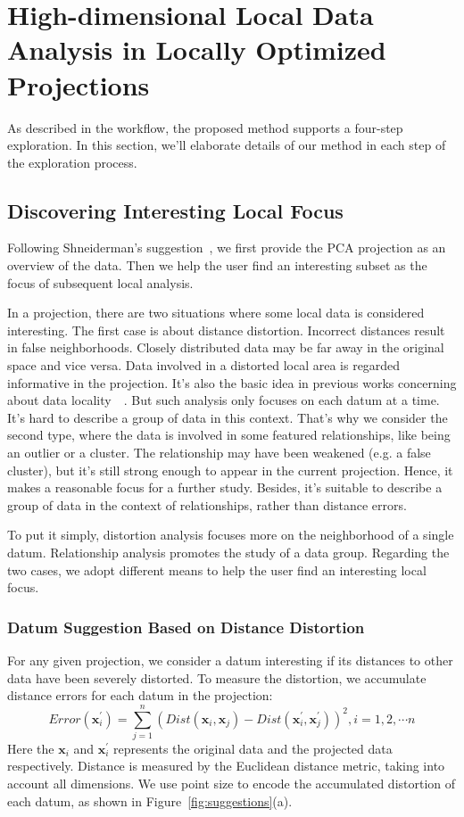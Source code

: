 \section{High-dimensional Local Data Analysis in Locally Optimized Projections}
As described in the workflow, the proposed method supports a four-step exploration. In this section, we'll elaborate details of our method in each step of the exploration process.
\label{section:method}
\subsection{Discovering Interesting Local Focus}
Following Shneiderman's suggestion~\cite{DBLP:conf/vl/Shneiderman96}, we first provide the PCA projection as an overview of the data. Then we help the user find an interesting subset as the focus of subsequent local analysis.

In a projection, there are two situations where some local data is considered interesting. The first case is about distance distortion. Incorrect distances result in false neighborhoods. Closely distributed data may be far away in the original space and vice versa. Data involved in a distorted local area is regarded informative in the projection. It's also the basic idea in previous works concerning about data locality~\cite{DBLP:journals/cg/MartinsCMT14}~\cite{DBLP:journals/tvcg/StahnkeDMT16}. But such analysis only focuses on each datum at a time. It's hard to describe a group of data in this context. That's why we consider the second type, where the data is involved in some featured relationships, like being an outlier or a cluster. The relationship may have been weakened (e.g. a false cluster), but it's still strong enough to appear in the current projection. Hence, it makes a reasonable focus for a further study. Besides, it's suitable to describe a group of data in the context of relationships, rather than distance errors.

To put it simply, distortion analysis focuses more on the neighborhood of a single datum. Relationship analysis promotes the study of a data group. Regarding the two cases, we adopt different means to help the user find an interesting local focus.

\subsubsection{Datum Suggestion Based on Distance Distortion}
For any given projection, we consider a datum interesting if its distances to other data have been severely distorted. To measure the distortion, we accumulate distance errors for each datum in the projection:
\begin{equation}
Error(\mathbf{x}_{i}^{\prime}) = \sum\limits_{j=1}^{n}(Dist(\mathbf{x}_{i}, \mathbf{x}_{j}) - Dist(\mathbf{x}_{i}^{\prime}, \mathbf{x}_{j}^{\prime}))^{2}, i = 1,2,\cdots n
\end{equation}
Here the $\mathbf{x}_{i}$ and $\mathbf{x}_{i}^{\prime}$ represents the original data and the projected data respectively. Distance is measured by the Euclidean distance metric, taking into account all dimensions. We use point size to encode the accumulated distortion of each datum, as shown in Figure~\ref{fig:suggestions}(a).

